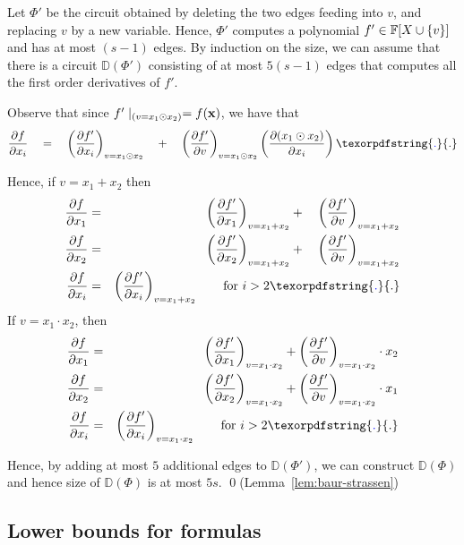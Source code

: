 \documentclass{birkjour}
\newcommand{\spaced}[1]{\quad#1\quad}
\providecommand{\DIFaddtex}[1]{{\protect\color{blue}\uwave{#1}}} %
\providecommand{\DIFaddbegin}{} %
\providecommand{\DIFaddend}{} %
\providecommand{\DIFdelbegin}{} %
\providecommand{\DIFdelend}{} %
\providecommand{\DIFadd}[1]{\texorpdfstring{\DIFaddtex{#1}}{#1}} %
\begin{document}
Let $\Phi'$ be the circuit obtained by deleting the two edges feeding into $v$, and replacing $v$ by a new variable. Hence, $\Phi'$ computes a polynomial $f' \in \mathbb{F}[X\cup \left\{v\right\}]$ and has at most $(s-1)$ edges. By induction on the size, we can assume that there is a circuit $\mathbb{D}(\Phi')$ consisting of at most $5(s-1)$ edges that computes all the first order derivatives of $f'$.

Observe that since $f'\mid_{(v = x_1 \odot x_2)} = f(\mathbf{x})$,  we have that 
$$
\parderiv{f}{x_i} \spaced{=}\inparen{\parderiv{f'}{x_i}}_{v = x_1 \odot x_2} \quad+\quad  \inparen{\parderiv{f'}{v}}_{v = x_1 \odot x_2}\inparen{\parderiv{(x_1 \odot x_2)}{x_i}}\DIFaddbegin \DIFadd{.
}\DIFaddend $$

Hence, if $v = x_1 + x_2$ then
\begin{eqnarray*}
  \parderiv{f}{x_1} & = & \inparen{\parderiv{f'}{x_1}}_{v=x_1 + x_2} +\quad \inparen{\parderiv{f'}{v}}_{v = x_1 + x_2}\\
  \parderiv{f}{x_2} & = & \inparen{\parderiv{f'}{x_2}}_{v=x_1 + x_2} +\quad \inparen{\parderiv{f'}{v}}_{v = x_1 + x_2}\\
  \parderiv{f}{x_i} & = & \DIFdelbegin %
\DIFdelend \DIFaddbegin \inparen{\parderiv{f'}{x_i}}\DIFaddend _{v=x_1 + x_2} \qquad\text{for $i>2$}\DIFaddbegin \DIFadd{.
}\DIFaddend \end{eqnarray*}
If $v = x_1 \cdot x_2$, then
\begin{eqnarray*}
  \parderiv{f}{x_1} & = & \inparen{\parderiv{f'}{x_1}}_{v=x_1 \cdot x_2} + \inparen{\parderiv{f'}{v}}_{v = x_1 \cdot x_2} \cdot x_2\\
  \parderiv{f}{x_2} & = & \inparen{\parderiv{f'}{x_2}}_{v=x_1 \cdot x_2} + \inparen{\parderiv{f'}{v}}_{v = x_1\cdot x_2}\cdot x_1\\
  \parderiv{f}{x_i} & = & \DIFdelbegin %
\DIFdelend \DIFaddbegin \inparen{\parderiv{f'}{x_i}}\DIFaddend _{v=x_1 \cdot x_2} \qquad\text{for $i>2$}\DIFaddbegin \DIFadd{.
}\DIFaddend \end{eqnarray*}

Hence, by adding at most $5$ additional edges to $\mathbb{D}(\Phi')$, we can construct $\mathbb{D}(\Phi)$ and hence size of $\mathbb{D}(\Phi)$ is at most $5s$. \qed (Lemma~\ref{lem:baur-strassen})

\subsection{Lower bounds for formulas}\label{sec:Kalorkoti}
\end{document}
